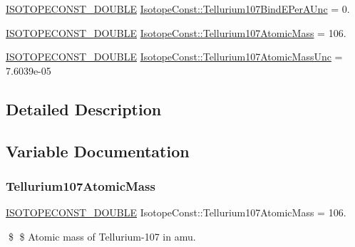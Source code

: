 \begin{DoxyCompactItemize}
\mbox{\hyperlink{group___isotope_const-_macros_ga8f45a7272ce02c0b4c65c44636ed719a}{I\+S\+O\+T\+O\+P\+E\+C\+O\+N\+S\+T\+\_\+\+D\+O\+U\+B\+LE}} \mbox{\hyperlink{group___isotope_const-_tellurium-_te107_gadaf22180a53078d90e091dcdac88d6c8}{Isotope\+Const\+::\+Tellurium107\+Bind\+E\+Per\+A\+Unc}} = 0.
\item 
\mbox{\hyperlink{group___isotope_const-_macros_ga8f45a7272ce02c0b4c65c44636ed719a}{I\+S\+O\+T\+O\+P\+E\+C\+O\+N\+S\+T\+\_\+\+D\+O\+U\+B\+LE}} \mbox{\hyperlink{group___isotope_const-_tellurium-_te107_gaa1f30489374d0bddae6335a31b76ca2f}{Isotope\+Const\+::\+Tellurium107\+Atomic\+Mass}} = 106.
\item 
\mbox{\hyperlink{group___isotope_const-_macros_ga8f45a7272ce02c0b4c65c44636ed719a}{I\+S\+O\+T\+O\+P\+E\+C\+O\+N\+S\+T\+\_\+\+D\+O\+U\+B\+LE}} \mbox{\hyperlink{group___isotope_const-_tellurium-_te107_gab048654bdb34c6e3e22cae16e79656ed}{Isotope\+Const\+::\+Tellurium107\+Atomic\+Mass\+Unc}} = 7.\+6039e-\/05
\end{DoxyCompactItemize}


\subsection{Detailed Description}


\subsection{Variable Documentation}
\mbox{\label{group___isotope_const-_tellurium-_te107_gaa1f30489374d0bddae6335a31b76ca2f}} 
\subsubsection{\texorpdfstring{Tellurium107\+Atomic\+Mass}{Tellurium107AtomicMass}}
{\footnotesize\ttfamily \mbox{\hyperlink{group___isotope_const-_macros_ga8f45a7272ce02c0b4c65c44636ed719a}{I\+S\+O\+T\+O\+P\+E\+C\+O\+N\+S\+T\+\_\+\+D\+O\+U\+B\+LE}} Isotope\+Const\+::\+Tellurium107\+Atomic\+Mass = 106.}

\$ \$ Atomic mass of Tellurium-\/107 in amu. \mbox{\label{group___isotope_const-_tellurium-_te107_gab048654bdb34c6e3e22cae16e79656ed}} 
